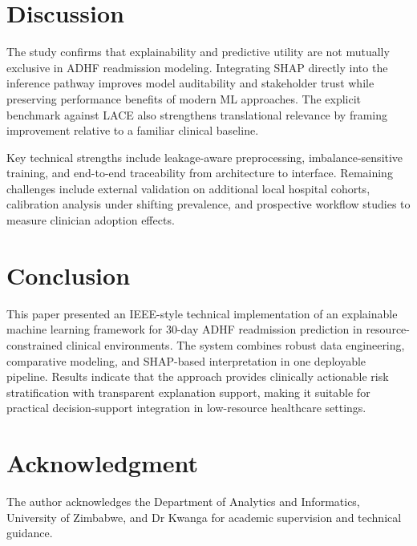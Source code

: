 \documentclass[conference]{IEEEtran}
\begin{document}
\section{Discussion}
The study confirms that explainability and predictive utility are not mutually exclusive in ADHF readmission modeling. Integrating SHAP directly into the inference pathway improves model auditability and stakeholder trust while preserving performance benefits of modern ML approaches. The explicit benchmark against LACE also strengthens translational relevance by framing improvement relative to a familiar clinical baseline.

Key technical strengths include leakage-aware preprocessing, imbalance-sensitive training, and end-to-end traceability from architecture to interface. Remaining challenges include external validation on additional local hospital cohorts, calibration analysis under shifting prevalence, and prospective workflow studies to measure clinician adoption effects.

\section{Conclusion}
This paper presented an IEEE-style technical implementation of an explainable machine learning framework for 30-day ADHF readmission prediction in resource-constrained clinical environments. The system combines robust data engineering, comparative modeling, and SHAP-based interpretation in one deployable pipeline. Results indicate that the approach provides clinically actionable risk stratification with transparent explanation support, making it suitable for practical decision-support integration in low-resource healthcare settings.

\section*{Acknowledgment}
The author acknowledges the Department of Analytics and Informatics, University of Zimbabwe, and Dr Kwanga for academic supervision and technical guidance.



\end{document}
